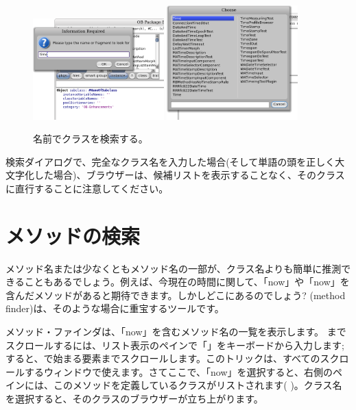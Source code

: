 \documentclass[a4paper,10pt,twoside]{book}
\begin{document}
\begin{figure}[hbt]
\centerline{
	\includegraphics[width=0.45\textwidth]{FindIt}
	\hspace{1cm}
	\includegraphics[width=0.45\textwidth]{TimeClasses}
}
\caption{名前でクラスを検索する。
}
\end{figure}

検索ダイアログで、完全なクラス名を入力した場合(そして単語の頭を正しく大文字化した場合)、ブラウザーは、候補リストを表示することなく、そのクラスに直行することに注意してください。

\section{メソッドの検索}

メソッド名または少なくともメソッド名の一部が、クラス名よりも簡単に推測できることもあるでしょう。例えば、今現在の時間に関して、「now」や「now」を含んだメソッドがあると期待できます。しかしどこにあるのでしょう?
 (method finder)は、そのような場合に重宝するツールです。

メソッド・ファインダは、「now」を含むメソッド名の一覧を表示します。
までスクロールするには、リスト表示のペインで「」をキーボードから入力します; すると、で始まる要素までスクロールします。このトリックは、すべてのスクロールするウィンドウで使えます。さてここで、「now」を選択すると、右側のペインには、このメソッドを定義しているクラスがリストされます( )。クラス名を選択すると、そのクラスのブラウザーが立ち上がります。
\end{document}
